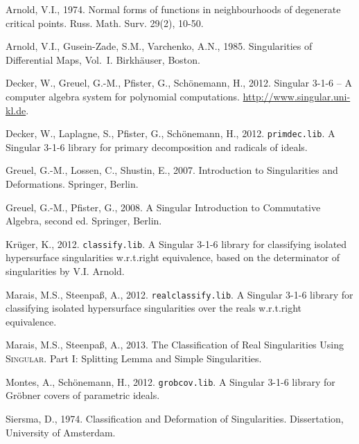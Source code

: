 \documentclass[noend]{amsproc}
\theoremstyle{definition}
\newcommand{\Singular}{\textsc{Singular}}
\begin{document}
\begin{thebibliography}{99}

Arnold, V.I., 1974.
Normal forms of functions in neighbourhoods of degenerate critical points.
Russ. Math. Surv. 29(2), 10-50.

Arnold, V.I., Gusein-Zade, S.M., Varchenko, A.N., 1985.
Singularities of Differential Maps, Vol.~I.
Birkh\"auser, Boston.

Decker, W., Greuel, G.-M., Pfister, G., Sch{\"o}nemann, H., 2012.
{\sc Singular} {3-1-6} -- {A} computer algebra system for polynomial
computations.
\url{http://www.singular.uni-kl.de}.

Decker, W., Laplagne, S., Pfister, G., Sch\"onemann, H., 2012.
{\tt primdec.lib}. {A} {\sc Singular} {3-1-6} library for primary decomposition
and radicals of ideals.

Greuel, G.-M., Lossen, C., Shustin, E., 2007.
Introduction to Singularities and Deformations.
Springer, Berlin.

Greuel, G.-M., Pfister, G., 2008.
A Singular Introduction to Commutative Algebra, second ed.
Springer, Berlin.

Kr\"uger, K., 2012.
{\tt classify.lib}. {A} {\sc Singular} {3-1-6} library for classifying isolated
hypersurface singularities w.r.t.\@ right equivalence, based on the
determinator of singularities by V.I. Arnold.

Marais, M.S., Steenpa\ss, A., 2012.
{\tt realclassify.lib}. {A} {\sc Singular} {3-1-6} library for classifying
isolated hypersurface singularities over the reals w.r.t.\@ right equivalence.

Marais, M.S., Steenpa\ss, A., 2013.
The Classification of Real Singularities Using \Singular{}. Part I: Splitting
Lemma and Simple Singularities.

Montes, A., Sch\"onemann, H., 2012.
{\tt grobcov.lib}. {A} {\sc Singular} {3-1-6} library for Gr\"obner covers of
parametric ideals.

Siersma, D., 1974.
Classification and Deformation of Singularities.
Dissertation, University of Amsterdam.

\end{thebibliography}
\end{document}
